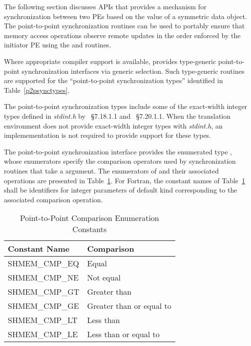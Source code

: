 The following section discusses \openshmem \acp{API} that provides a mechanism
for synchronization between two \acp{PE} based on the value of a symmetric data
object.
The point-to-point synchronization routines can be used to portably ensure
that memory access operations observe remote updates in the order enforced by
the initiator \ac{PE} using the  and 
routines.

Where appropriate compiler support is available, \openshmem provides
type-generic point-to-point synchronization interfaces via \Cstd[11] generic
selection. Such type-generic routines are supported for the
``point-to-point synchronization types'' identified in
Table~\ref{p2psynctypes}.

The point-to-point synchronization types include some of the exact-width
integer types defined in \textit{stdint.h} by \Cstd[99]~\S7.18.1.1 and
\Cstd[11]~\S7.20.1.1. When the \Cstd translation environment
does not provide exact-width integer types with \textit{stdint.h}, an
\openshmem implemementation is not required to provide support for these types.



The point-to-point synchronization interface provides the enumerated type
, whose enumerators specify the comparison operators used
by synchronization routines that take a  argument. The
enumerators of  and their associated operations are
presented in Table~\ref{p2p-consts}.  For Fortran, the constant names of
Table~\ref{p2p-consts} shall be identifiers for integer parameters of
default kind corresponding to the associated comparison operation.

\begin{table}[h]
  \begin{center}
    \begin{tabular}{ll}
      \hline
      Constant Name    & Comparison               \\ \hline
      SHMEM\_CMP\_EQ   & Equal                    \\
      SHMEM\_CMP\_NE   & Not equal                \\
      SHMEM\_CMP\_GT   & Greater than             \\
      SHMEM\_CMP\_GE   & Greater than or equal to \\
      SHMEM\_CMP\_LT   & Less than                \\
      SHMEM\_CMP\_LE   & Less than or equal to    \\ \hline
    \end{tabular}
    \caption{Point-to-Point Comparison Enumeration Constants}
    \label{p2p-consts}
  \end{center}
\end{table}

